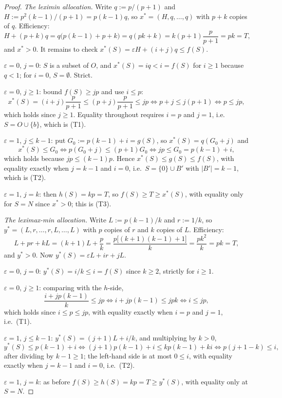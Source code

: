 \documentclass[11pt]{article}
\begin{document}
\begin{proof}
\emph{The leximin allocation.}  Write $q:=p/(p+1)$ and
$H:=p^2(k-1)/(p+1)=p(k-1)q$, so $x^*=(H,q,\dots,q)$ with $p+k$ copies of $q$.
Efficiency:
\[
 H+(p+k)q=q\bigl(p(k-1)+p+k\bigr)=q(pk+k)=k(p+1)\frac{p}{p+1}=pk=T,
\]
and $x^*>0$.  It remains to check $x^*(S)=\varepsilon H+(i+j)q\le f(S)$.

$\varepsilon=0$, $j=0$: $S$ is a subset of $O$, and $x^*(S)=iq<i=f(S)$ for
$i\ge1$ because $q<1$; for $i=0$, $S=\emptyset$.  Strict.

$\varepsilon=0$, $j\ge1$: bound $f(S)\ge jp$ and use $i\le p$:
\[
 x^*(S)=(i+j)\frac{p}{p+1}\le(p+j)\frac{p}{p+1}\le jp
 \iff p+j\le j(p+1)\iff p\le jp,
\]
which holds since $j\ge1$.  Equality throughout requires $i=p$ and $j=1$,
i.e.\ $S=O\cup\{b\}$, which is (T1).

$\varepsilon=1$, $j\le k-1$: put $G_0:=p(k-1)+i=g(S)$, so $x^*(S)=q(G_0+j)$
and
\[
 x^*(S)\le G_0\iff p(G_0+j)\le(p+1)G_0\iff jp\le G_0=p(k-1)+i,
\]
which holds because $jp\le(k-1)p$.  Hence $x^*(S)\le g(S)\le f(S)$, with
equality exactly when $j=k-1$ and $i=0$, i.e.\ $S=\{0\}\cup B'$ with
$|B'|=k-1$, which is (T2).

$\varepsilon=1$, $j=k$: then $h(S)=kp=T$, so $f(S)\ge T\ge x^*(S)$, with
equality only for $S=N$ since $x^*>0$; this is (T3).

\emph{The leximax-min allocation.}  Write $L:=p(k-1)/k$ and $r:=1/k$, so
$y^*=(L,r,\dots,r,L,\dots,L)$ with $p$ copies of $r$ and $k$ copies of $L$.
Efficiency:
\[
 L+pr+kL=(k+1)L+\frac pk=\frac{p\bigl[(k+1)(k-1)+1\bigr]}{k}=\frac{pk^2}{k}=pk=T,
\]
and $y^*>0$.  Now $y^*(S)=\varepsilon L+ir+jL$.

$\varepsilon=0$, $j=0$: $y^*(S)=i/k\le i=f(S)$ since $k\ge2$, strictly for
$i\ge1$.

$\varepsilon=0$, $j\ge1$: comparing with the $h$-side,
\[
 \frac{i+jp(k-1)}{k}\le jp\iff i+jp(k-1)\le jpk\iff i\le jp,
\]
which holds since $i\le p\le jp$, with equality exactly when $i=p$ and $j=1$,
i.e.\ (T1).

$\varepsilon=1$, $j\le k-1$: $y^*(S)=(j+1)L+i/k$, and multiplying by $k>0$,
\[
 y^*(S)\le p(k-1)+i
 \iff (j+1)p(k-1)+i\le kp(k-1)+ki
 \iff p(j+1-k)\le i,
\]
after dividing by $k-1\ge1$; the left-hand side is at most $0\le i$, with
equality exactly when $j=k-1$ and $i=0$, i.e.\ (T2).

$\varepsilon=1$, $j=k$: as before $f(S)\ge h(S)=kp=T\ge y^*(S)$, with
equality only at $S=N$.
\end{proof}
\end{document}
